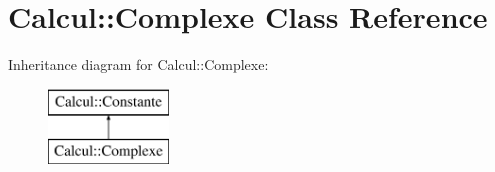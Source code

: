 \hypertarget{class_calcul_1_1_complexe}{\section{Calcul\-:\-:Complexe Class Reference}
\label{class_calcul_1_1_complexe}
}
Inheritance diagram for Calcul\-:\-:Complexe\-:\begin{figure}[H]
\begin{center}
\leavevmode
\includegraphics[height=2.000000cm]{class_calcul_1_1_complexe}
\end{center}
\end{figure}
